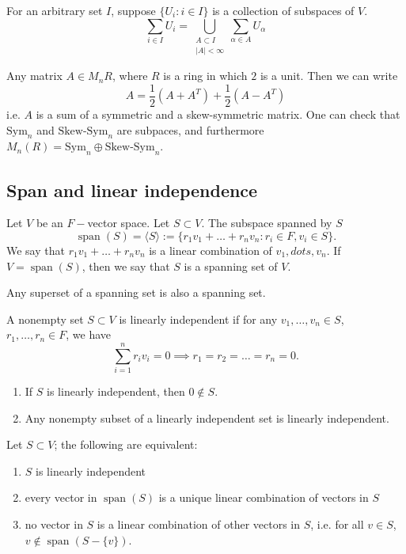 \documentclass{scrartcl}
\DeclareMathOperator{\spn}{span}  %
\begin{document}
\begin{definition}
	For an arbitrary set $I$, suppose $\{U_i: i\in I\}$ is a collection of subspaces of $V$. 
	\[\sum_{i \in I}U_i = \bigcup_{\substack{A \subset I \\ |A| < \infty}} \sum_{\alpha \in A}U_\alpha\]
\end{definition}
\begin{example}
	Any matrix $A \in M_n{R}$, where $R$ is a ring in which $2$ is a unit. Then we can write
	\[A = \frac{1}{2}(A+A^T) + \frac{1}{2}(A-A^T)\]
	i.e. $A$ is a sum of a symmetric and a skew-symmetric matrix. One can check that $\text{Sym}_n$ and $\text{Skew-Sym}_n$ are subpaces, and furthermore $M_n(R) = \text{Sym}_n \oplus \text{Skew-Sym}_n$. 
\end{example}
\subsection{Span and linear independence}
\begin{definition}
	Let $V$ be an $F-$vector space. Let $S \subset V$. The subspace spanned by $S$
	\[\spn(S) = \langle S \rangle:= \{r_1v_1+\dots+r_nv_n: r_i \in F, v_i \in S\}.\]
	We say that $r_1v_1+\dots+r_nv_n$ is a linear combination of $v_1, dots, v_n$. If $V = \spn(S)$, then we say that $S$ is a spanning set of $V$.
\end{definition}
\begin{remark}
	Any superset of a spanning set is also a spanning set. 
\end{remark}
\begin{definition}
	A nonempty set $S \subset V$ is linearly independent if for any $v_1, \dots, v_n \in S$, $r_1, \dots, r_n \in F$, we have
	\[\sum_{i=1}^n r_iv_i=0 \implies r_1=r_2=\dots=r_n=0.\]
\end{definition}
\begin{remark}
	\begin{enumerate}
		\item If $S$ is linearly independent, then $0 \notin S$.
		\item Any nonempty subset of a linearly independent set is linearly independent.
	\end{enumerate}
\end{remark}
\begin{lemma}
	Let $S \subset V$; the following are equivalent:
	\begin{enumerate}
		\item $S$ is linearly independent
		\item every vector in $\spn(S)$ is a unique linear combination of vectors in $S$
		\item no vector in $S$ is a linear combination of other vectors in $S$, i.e. for all $v \in S$, $v \notin \spn(S-\{v\})$.
	\end{enumerate}
\end{lemma}
\end{document}
